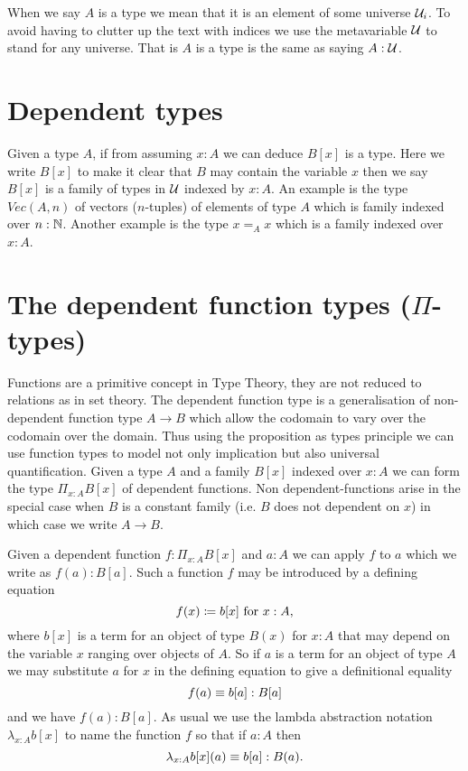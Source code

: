When we say $A$ is a type we mean that it is an element of some
universe $\mathcal{U}_i$. To avoid having to clutter up the text with indices
we use the metavariable $\mathcal{U}$ to stand for any universe. That is $A$
is a type is the same as saying $A : \mathcal{U}$.


\section{Dependent types}
\label{sec:dependent-types}

Given a type $A$, if from assuming $x:A$ we can deduce $B[x]$ is a type.
Here we write $B[x]$ to make it clear that $B$ may contain the
variable $x$ then we say $B[x]$ is a
family of types in $\mathcal{U}$ indexed by $x:A$. An example is the type $Vec(A,n)$ of
vectors ($n$-tuples) of elements of type $A$ which is family indexed
over $n : \mathbb{N}$. Another example is the type $x =_A x$ which is a
family indexed over $x : A$.


\section{The dependent function types ($\Pi$-types)}
\label{sec:pi-types}

Functions are a primitive concept in Type Theory, they are not reduced
to relations as in set theory. The dependent function type is a
generalisation of non-dependent function type $A \to B$ which allow
the codomain to vary over the codomain over the domain. Thus using the
proposition as types principle we can use function types to model not
only implication but also universal quantification. Given a type $A$
and a family $B[x]$ indexed over $x:A$ we can form the type
$\Pi_{x:A}B[x]$ of dependent functions. Non dependent-functions arise
in the special case when $B$ is a constant family (i.e. $B$ does not
dependent on $x$) in which case we write $A \to B$.

Given a dependent function $f : \Pi_{x:A}B[x]$ and $a : A$ we can
apply $f$ to $a$ which we write as $f(a) : B[a]$.  Such a function $f$ may be introduced by a defining equation
  \[ f(x)\coloneqq b[x]\mbox{ for } x:A,\]
where $b[x]$ is a term for an object of type $B(x)$ for $x:A$ that may depend on the variable $x$ ranging over objects of $A$.  So if $a$ is a term for an object of type $A$ we may substitute $a$ for $x$ in the defining equation to give a definitional equality
  \[ f(a)\equiv b[a]:B[a]\]
and we have $f(a):B[a]$.  As usual we use the lambda abstraction notation 
$\lambda_{x:A}b[x]$ to name the function $f$ so that if $a:A$ then
  \[\lambda_{x:A}b[x](a)\equiv b[a]: B(a).\]

